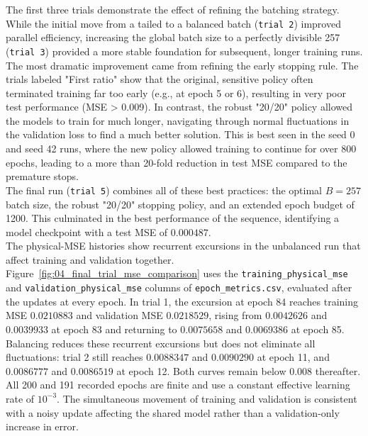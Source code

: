 The first three trials demonstrate the effect of refining the batching strategy. While the initial move from a tailed to a balanced batch (\texttt{trial 2}) improved parallel efficiency, increasing the global batch size to a perfectly divisible 257 (\texttt{trial 3}) provided a more stable foundation for subsequent, longer training runs.\\

The most dramatic improvement came from refining the early stopping rule.  The trials labeled "First ratio" show that the original, sensitive policy often terminated training far too early (e.g., at epoch 5 or 6), resulting in very poor test performance (MSE > 0.009). In contrast, the robust "20/20" policy allowed the models to train for much longer, navigating through normal fluctuations in the validation loss to find a much better solution. This is best seen in the seed 0 and seed 42 runs, where the new policy allowed training to continue for over 800 epochs, leading to a more than 20-fold reduction in test MSE compared to the premature stops.\\

The final run (\texttt{trial 5}) combines all of these best practices: the optimal $B=257$ batch size, the robust "20/20" stopping policy, and an extended epoch budget of 1200. This culminated in the best performance of the sequence, identifying a model checkpoint with a test MSE of $0.000487$.\\

The physical-MSE histories show recurrent excursions in the unbalanced run that affect training and validation together. Figure~\ref{fig:04_final_trial_mse_comparison} uses the \texttt{training\_physical\_mse} and \texttt{validation\_physical\_mse} columns of \texttt{epoch\_metrics.csv}, evaluated after the updates at every epoch. In trial 1, the excursion at epoch 84 reaches training MSE $0.0210883$ and validation MSE $0.0218529$, rising from $0.0042626$ and $0.0039933$ at epoch 83 and returning to $0.0075658$ and $0.0069386$ at epoch 85. Balancing reduces these recurrent excursions but does not eliminate all fluctuations: trial 2 still reaches $0.0088347$ and $0.0090290$ at epoch 11, and $0.0086777$ and $0.0086519$ at epoch 12. Both curves remain below $0.008$ thereafter. All 200 and 191 recorded epochs are finite and use a constant effective learning rate of $10^{-3}$. The simultaneous movement of training and validation is consistent with a noisy update affecting the shared model rather than a validation-only increase in error.\\

